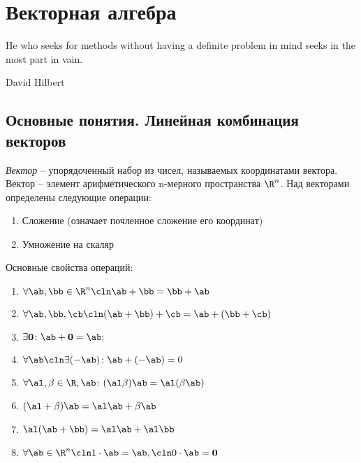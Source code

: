 \section{Векторная алгебра}
\label{vector}

\epigraph{He who seeks for methods without having a definite problem 
  in mind seeks in the most part in vain.}{David Hilbert}

\subsection{Основные понятия. Линейная комбинация векторов}

\begin{df}
  \emph{Вектор} -- упорядоченный набор из чисел, называемых координатами вектора. Вектор -- элемент арифметического n-мерного пространства $\R^n$. Над векторами определены следующие операции:
  \begin{enumerate}
    \item Сложение (означает почленное сложение его координат)
    \item Умножение на скаляр
  \end{enumerate}
\end{df}

Основные свойства операций:

\begin{enumerate}
  \item $\forall \ab,\bb\in\R^n\cln \ab+\bb=\bb+\ab$
  \item $\forall \ab,\bb,\cb \cln (\ab+\bb)+\cb=\ab+(\bb+\cb)$
  \item $\exists \mathbf 0\colon \ab+\mathbf 0=\ab;$
  \item $\forall \ab\cln\exists(-\ab)\colon \ab+(-\ab)=0$
  \item $\forall\al,\beta\in\R, \ab\colon (\al\beta)\ab=\al(\beta \ab)$
  \item $(\al+\beta)\ab=\al \ab+\beta \ab$
  \item $\al(\ab+\bb)=\al \ab+\al \bb$
  \item $\forall\ab\in\R^n\cln1\cdot\ab=\ab,\cln 0\cdot\ab=\mathbf 0$
\end{enumerate}

